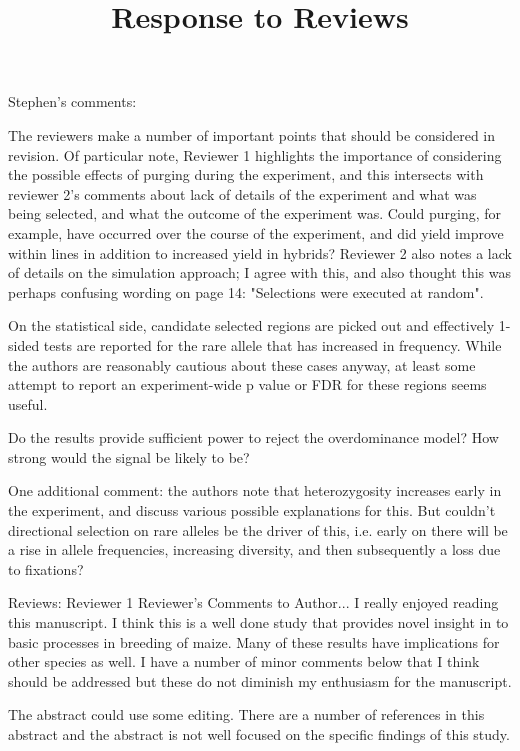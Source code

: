 \documentclass[onecolumn,oneside,letterpaper]{article}
\title{Response to Reviews}
\begin{document}
\maketitle


Stephen's comments:

The reviewers make a number of important points that should be considered in revision. Of particular note, Reviewer 1 highlights the importance of considering the possible effects of purging during the experiment, and this intersects with reviewer 2's comments about lack of details of the experiment and what was being selected, and what the outcome of the experiment was. Could purging, for example, have occurred over the course of the experiment, and did yield improve within lines in addition to increased yield in hybrids? Reviewer 2 also notes a lack of details on the simulation approach; I agree with this, and also thought this was perhaps confusing wording on page 14: "Selections were executed at random".

On the statistical side, candidate selected regions are picked out and effectively 1-sided tests are reported for the rare allele that has increased in frequency. While the authors are reasonably cautious about these cases anyway, at least some attempt to report an experiment-wide p value or FDR for these regions seems useful.

Do the results provide sufficient power to reject the overdominance model? How strong would the signal be likely to be?

One additional comment: the authors note that heterozygosity increases early in the experiment, and discuss various possible explanations for this. But couldn't directional selection on rare alleles be the driver of this, i.e. early on there will be a rise in allele frequencies, increasing diversity, and then subsequently a loss due to fixations?

Reviews:
Reviewer 1 Reviewer's Comments to Author...
I really enjoyed reading this manuscript.  I think this is a well done study 
that provides novel insight in to basic processes in breeding of maize.  Many of 
these results have implications for other species as well.  I have a number of 
minor comments below that I think should be addressed but these do not diminish 
my enthusiasm for the manuscript.

The abstract could use some editing.  There are a number of references in this 
abstract and the abstract is not well focused on the specific findings of this 
study.  
\end{document}
